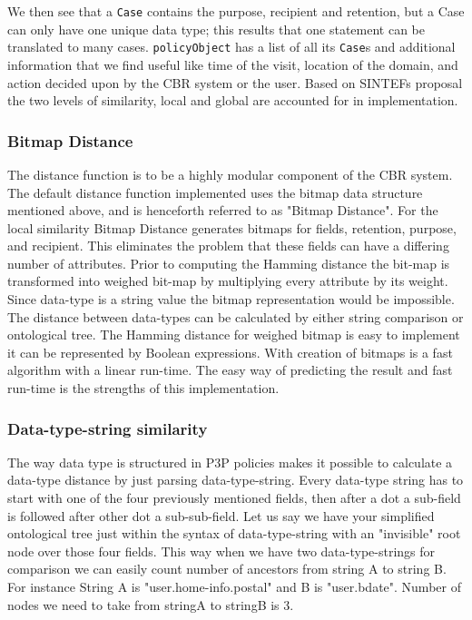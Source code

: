 We then see that a \texttt{Case} contains the purpose, recipient and retention, but a Case can only have one unique data type; this results that one statement can be translated to many cases. \texttt{policyObject} has a list of all its \texttt{Case}s and additional information that we find useful like time of the visit, location of the domain, and action decided upon by the CBR system or the user. Based on SINTEFs proposal the two levels of similarity, local and global are accounted for in implementation. 

\subsubsection{Bitmap Distance}

The distance function is to be a highly modular component of the CBR system. The default distance function implemented uses the bitmap data structure mentioned above, and is henceforth referred to as "Bitmap Distance". For the local similarity Bitmap Distance generates bitmaps for fields, retention, purpose, and recipient. This eliminates the problem that these fields can have a differing number of attributes.  Prior to computing the Hamming distance the bit-map is transformed into weighed bit-map by multiplying every attribute by its weight. Since data-type is a string value the bitmap representation would be impossible. The distance between data-types can be calculated by either string comparison or ontological tree. The Hamming distance for weighed bitmap is easy to implement it can be represented by Boolean expressions. With creation of bitmaps is a fast algorithm with a linear run-time. The easy way of predicting the result and fast run-time is the strengths of this implementation.



\subsubsection{Data-type-string similarity}
The way data type is structured in P3P policies makes it possible to calculate a data-type distance by just parsing data-type-string. Every data-type string has to start with one of the four previously mentioned fields, then after a dot a sub-field is followed after other dot a sub-sub-field. Let us say we have your simplified ontological tree just within the syntax of data-type-string with an "invisible" root node over those four fields. This way when we have two data-type-strings for comparison we can easily count number of ancestors from string A to string B. For instance String A is "user.home-info.postal" and B is "user.bdate". Number of nodes we need to take from stringA to stringB is 3. 

